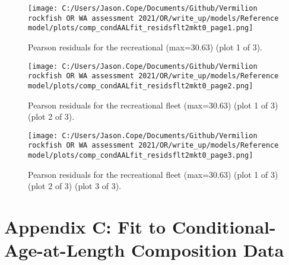 \documentclass[11pt,
  english,
  a4paper,
]{article}
\begin{document}
\tagmcend\tagstructend


\begin{figure}
\centering
\texttt{[image: C:/Users/Jason.Cope/Documents/Github/Vermilion rockfish OR WA assessment 2021/OR/write\_up/models/Reference model/plots/comp\_condAALfit\_residsflt2mkt0\_page1.png]}
\caption{Pearson residuals for the recreational (max=30.63) (plot 1 of 3).\label{fig:comp_condAALfit_residsflt2mkt0_page1}}
\end{figure}

\tagmcend\tagstructend


\begin{figure}
\centering
\texttt{[image: C:/Users/Jason.Cope/Documents/Github/Vermilion rockfish OR WA assessment 2021/OR/write\_up/models/Reference model/plots/comp\_condAALfit\_residsflt2mkt0\_page2.png]}
\caption{Pearson residuals for the recreational fleet (max=30.63) (plot 1 of 3) (plot 2 of 3).\label{fig:comp_condAALfit_residsflt2mkt0_page2}}
\end{figure}

\tagmcend\tagstructend


\begin{figure}
\centering
\texttt{[image: C:/Users/Jason.Cope/Documents/Github/Vermilion rockfish OR WA assessment 2021/OR/write\_up/models/Reference model/plots/comp\_condAALfit\_residsflt2mkt0\_page3.png]}
\caption{Pearson residuals for the recreational fleet (max=30.63) (plot 1 of 3) (plot 2 of 3) (plot 3 of 3).\label{fig:comp_condAALfit_residsflt2mkt0_page3}}
\end{figure}

\tagmcend\tagstructend

\clearpage


\hypertarget{app-c}{%
\section{Appendix C: Fit to Conditional-Age-at-Length Composition Data}\label{app-c}}
\end{document}
